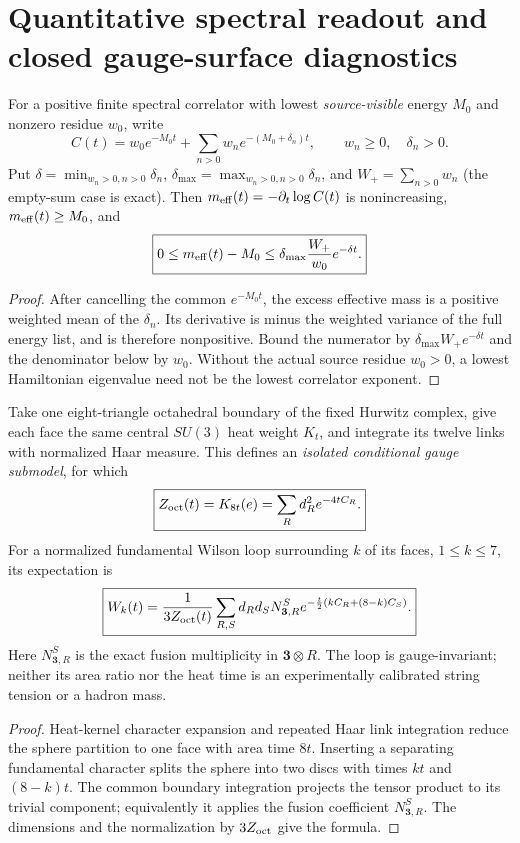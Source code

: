 \documentclass[12pt,a4paper]{article}
\begin{document}
\section{Quantitative spectral readout and closed gauge-surface diagnostics}
\label{p11:sec:v356-closed-gauge-readouts}

\begin{proposition}
\label{p11:prop:v356-hadron-effective-mass-error}
For a positive finite spectral correlator with lowest \emph{source-visible}
energy $M_0$ and nonzero residue $w_0$, write
\[
 C(t)=w_0e^{-M_0t}+\sum_{n>0}w_ne^{-(M_0+\delta_n)t},
 \qquad w_n\ge0,\quad\delta_n>0.
\]
Put $\delta=\min_{w_n>0,n>0}\delta_n$,
$\delta_{\max}=\max_{w_n>0,n>0}\delta_n$, and
$W_+=\sum_{n>0}w_n$ (the empty-sum case is exact).
Then $m_{\rm eff}(t)=-\partial_t\log C(t)$ is nonincreasing,
$m_{\rm eff}(t)\ge M_0$, and
\[
 \boxed{0\le m_{\rm eff}(t)-M_0
       \le\delta_{\max}\frac{W_+}{w_0}e^{-\delta t}.}
\]
\end{proposition}
\begin{proof}
After cancelling the common $e^{-M_0t}$, the excess effective
mass is a positive weighted mean of the $\delta_n$.
Its derivative is minus the weighted variance of the full energy
list, and is therefore nonpositive.  Bound the numerator by
$\delta_{\max} W_+e^{-\delta t}$ and the denominator below by
$w_0$.  Without the actual source residue $w_0>0$, a lowest
Hamiltonian eigenvalue need not be the lowest correlator exponent.
\end{proof}

\begin{theorem}
\label{p11:thm:v356-octa-heat-wilson}
Take one eight-triangle octahedral boundary of the fixed Hurwitz
complex, give each face the same central $SU(3)$ heat weight $K_t$,
and integrate its twelve links with normalized Haar measure.
This defines an \emph{isolated conditional gauge submodel}, for which
\[
 \boxed{Z_{\rm oct}(t)=K_{8t}(e)
      =\sum_R d_R^2e^{-4tC_R}.}
\]
For a normalized fundamental Wilson loop surrounding $k$ of its
faces, $1\le k\le7$, its expectation is
\[
 \boxed{W_k(t)=\frac{1}{3Z_{\rm oct}(t)}
 \sum_{R,S}d_Rd_S N_{\mathbf3,R}^{S}
 e^{-\frac t2(kC_R+(8-k)C_S)}.}
\]
Here $N_{\mathbf3,R}^{S}$ is the exact fusion multiplicity in
$\mathbf3\otimes R$.  The loop is gauge-invariant; neither its
area ratio nor the heat time is an experimentally calibrated string
tension or a hadron mass.
\end{theorem}
\begin{proof}
Heat-kernel character expansion and repeated Haar link integration
reduce the sphere partition to one face with area time $8t$.
Inserting a separating fundamental character splits the sphere
into two discs with times $kt$ and $(8-k)t$.
The common boundary integration projects the tensor product to
its trivial component; equivalently it applies the fusion
coefficient $N_{\mathbf3,R}^{S}$.  The dimensions and the
normalization by $3Z_{\rm oct}$ give the formula.
\end{proof}
\end{document}
